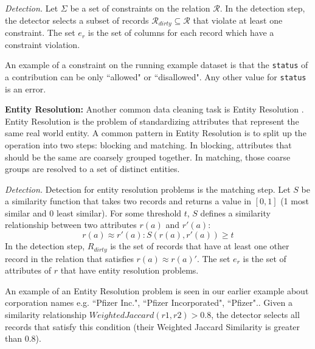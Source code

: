 \emph{Detection. } Let $\Sigma$ be a set of constraints on the relation $\mathcal{R}$. 
In the detection step, the detector selects a subset of records $\mathcal{R}_{dirty} \subseteq \mathcal{R}$ that violate at least one constraint.
The set $e_r$ is the set of columns for each record which have a constraint violation. 

\begin{example}
An example of a constraint on the running example dataset is that the \texttt{status} of
a contribution can be only ``allowed" or ``disallowed".
Any other value for \texttt{status} is an error.
\end{example}

\vspace{0.5em}

\noindent\textbf{Entity Resolution: }
Another common data cleaning task is Entity Resolution \cite{gokhale2014corleone, DBLP:journals/pvldb/KopckeTR10, wang2012crowder}.
Entity Resolution is the problem of standardizing attributes that represent the same real world entity.
A common pattern in Entity Resolution is to split up the operation into two steps: blocking and matching.
In blocking, attributes that should be the same are coarsely grouped together.
In matching, those coarse groups are resolved to a set of distinct entities.

\vspace{0.5em}

\emph{Detection. } Detection for entity resolution problems is the matching step. Let $S$ be a similarity function that takes two records and returns a value in $[0,1]$ (1 most similar and 0 least similar). For some threshold $t$, $S$ defines a similarity relationship between two attributes $r(a)$ and $r'(a)$:
\[
r(a) \approx r'(a) : S(r(a),r'(a)) \ge t
\] 
In the detection step, $R_{dirty}$ is the set of records that have at least one other record in the relation that satisfies $r(a) \approx r(a)'$.
The set $e_r$ is the set of attributes of $r$ that have entity resolution problems.

\begin{example}
An example of an Entity Resolution problem is seen in our earlier example about corporation names e.g. ``Pfizer Inc.", ``Pfizer Incorporated", ``Pfizer".. 
Given a similarity relationship $WeightedJaccard(r1,r2)>0.8$, the detector selects all records that satisfy this condition (their Weighted Jaccard Similarity is greater than 0.8).
\end{example}

